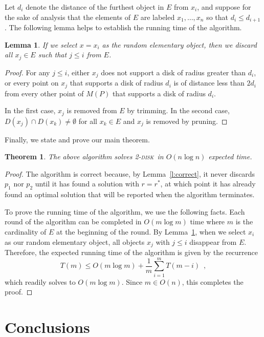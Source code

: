 \documentclass[twoside]{report}
\newtheorem{lem}{Lemma}
\newtheorem{thm}{Theorem}
\newcommand{\seclabel}[1]{\label{sec:#1}}
\newcommand{\tdisk}{\textsc{2-disk}}
\begin{document}
\begin{paper}
Let $d_i$ denote the distance of the furthest object in $E$ from
$x_i$, and suppose for the sake of analysis that the elements of $E$
are labeled $x_1,\ldots,x_n$ so that $d_i\le d_{i+1}$.  The following
lemma helps to establish the running time of the algorithm.

\begin{lem}\label{l:split}
If we select $x=x_i$ as the random elementary object, then we discard all
$x_j\in E$ such that $j \leq i$ from $E$.
\end{lem}

\begin{proof}
  For any $j\le i$, either $x_j$ does not support a disk of radius
  greater than $d_i$, or every point on $x_j$ that supports a disk of
  radius $d_i$ is of distance less than $2d_i$ from every other point of
  $M(P)$ that supports a disk of radius $d_i$.
  
  In the first case, $x_j$ is removed from $E$ by trimming.  In the
  second case, $D(x_j)\cap D(x_k)\neq\emptyset$ for all $x_k\in E$ and $x_j$
  is removed by pruning.
\end{proof}

Finally, we state and prove our main theorem.

\begin{thm}
The above algorithm 
solves \tdisk\ in $O(n\log n)$
expected time.
\end{thm}

\begin{proof}
  The algorithm is correct because, by Lemma~\ref{l:correct}, it never
  discards $p_1$ nor $p_2$ until it has found a solution with $r=r^*$,
  at which point it has already found an optimal solution that will be
  reported when the algorithm terminates.
  
  To prove the running time of the algorithm, we use the following
  facts.  Each round of the algorithm can be completed in $O(m\log m)$
  time where $m$ is the cardinality of $E$ at the beginning of the
  round.  By Lemma~\ref{l:split}, when we select $x_i$ as our random
  elementary object, all objects $x_j$ with $j \leq i$ disappear from $E$.
  Therefore, the expected running time of the algorithm is given by
  the recurrence
\[
T(m) \le O(m\log m) + \frac{1}{m}\sum_{i=1}^{m}T(m-i) 
        \enspace, 
\] 
which readily solves to $O(m\log m)$.  Since $m\in O(n)$, this
completes the proof.
\end{proof}


\section{Conclusions}\seclabel{conclusions}


\end{paper}
\end{document}
